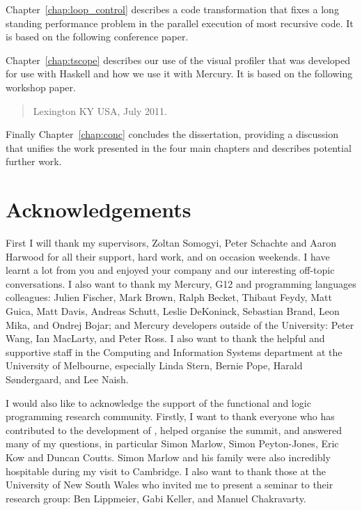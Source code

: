 \documentclass[a4paper,twoside,openright]{report}
\begin{document}
Chapter~\ref{chap:loop_control} describes a code transformation that fixes 
a long standing performance problem in the parallel execution of most
recursive code.
It is based on the following conference paper.

\begin{quote}
\end{quote}

Chapter~\ref{chap:tscope} describes our use of the \tscope visual
profiler that was developed for use with Haskell and how we use it with
Mercury.
It is based on the following workshop paper.

\begin{quote}
{Lexington KY USA, July 2011.}
\end{quote}

Finally Chapter~\ref{chap:conc} concludes the dissertation, providing a
discussion that unifies the work presented in the four main chapters and
describes potential further work.

\chapter*{Acknowledgements}

First I will thank my supervisors,
Zoltan Somogyi,
Peter Schachte and
Aaron Harwood
for all their support, hard work, and on occasion weekends.
I have learnt a lot from you and enjoyed your company and our interesting
off-topic conversations.
I also want to thank my Mercury, G12 and programming languages colleagues:
Julien Fischer,
Mark Brown,
Ralph Becket, 
Thibaut Feydy,
Matt Guica,
Matt Davis,
Andreas Schutt,
Leslie DeKoninck,
Sebastian Brand,
Leon Mika,
and
Ondrej Bojar;
and Mercury developers outside of the University:
Peter Wang,
Ian MacLarty,
and
Peter Ross.
I also want to thank the helpful and supportive staff in the Computing and
Information Systems department at the University of Melbourne,
especially
Linda Stern,
Bernie Pope,
Harald S{\o}ndergaard, and
Lee Naish.

I would also like to acknowledge the support of the functional and logic
programming research community.
Firstly, I want to thank everyone
who has contributed to the development of \tscope,
helped organise the \tscope summit, and
answered many of my questions,
in particular
Simon Marlow,
Simon Peyton-Jones,
Eric Kow
and Duncan Coutts.
Simon Marlow and his family were also incredibly hospitable during my visit
to Cambridge.
I also want to thank those at the University of New South Wales who invited
me to present a seminar to their research group:
Ben Lippmeier,
Gabi Keller,
and Manuel Chakravarty.
\end{document}
